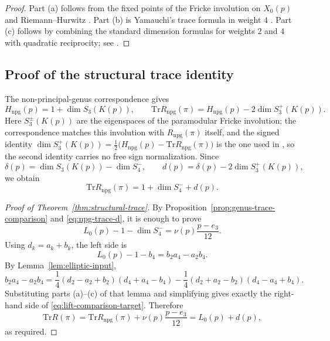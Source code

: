 \documentclass[10pt,a4paper]{amsart}
\newcommand{\Tr}{\mathrm{Tr}}
\begin{document}
	\begin{proof}
		Part \textup{(a)} follows from the fixed points of the Fricke involution
		on $X_0(p)$ and Riemann--Hurwitz \cite[\S2]{Ogg1974}. Part \textup{(b)} is Yamauchi's trace
		formula in weight $4$ \cite{Yamauchi1973}. Part \textup{(c)} follows by combining the standard
		dimension formulas for weights $2$ and $4$ with quadratic reciprocity; see
		\cite{AtkinLehner,Ibukiyama-dim}.
	\end{proof}
	
	\subsection{Proof of the structural trace identity}
	\label{ss:proof-structural-trace}
	
	The non-principal-genus correspondence \cite{DPRT,Ibukiyama-dim} gives
	\begin{equation}\label{eq:npg-dimension-trace}
		H_{\mathrm{npg}}(p)=1+\dim S_3(K(p)),
		\qquad
		\Tr R_{\mathrm{npg}}(\pi)
		=H_{\mathrm{npg}}(p)-2\dim S_3^+(K(p)).
	\end{equation}
	Here $S_3^\pm(K(p))$ are the eigenspaces of the paramodular Fricke
	involution; the correspondence matches this involution with
	$R_{\mathrm{npg}}(\pi)$ itself, and the signed identity
	$\dim S_3^{+}(K(p))=\tfrac12\bigl(H_{\mathrm{npg}}(p)-\Tr R_{\mathrm{npg}}(\pi)\bigr)$
	is the one used in \cite[proof of Prop.~8.2]{Ibukiyama-dim}, so the
	second identity carries no free sign normalization.
	Since
	\[
	\delta(p)=\dim S_3(K(p))-\dim S_4^-,
	\qquad
	d(p)=\delta(p)-2\dim S_3^+(K(p)),
	\]
	we obtain
	\begin{equation}\label{eq:npg-trace-d}
		\Tr R_{\mathrm{npg}}(\pi)=1+\dim S_4^-+d(p).
	\end{equation}
	
	\begin{proof}[Proof of Theorem~\ref{thm:structural-trace}]
		By Proposition~\ref{prop:genus-trace-comparison} and
		\eqref{eq:npg-trace-d}, it is enough to prove
		\begin{equation}\label{eq:lift-comparison-target}
			L_0(p)-1-\dim S_4^-=
			\nu(p)\frac{p-e_3}{12}.
		\end{equation}
		Using $d_k=a_k+b_k$, the left side is
		\[
		L_0(p)-1-b_4=b_2a_4-a_2b_4.
		\]
		By Lemma~\ref{lem:elliptic-input},
		\[
		b_2a_4-a_2b_4
		=\frac14(d_2-a_2+b_2)(d_4+a_4-b_4)
		-\frac14(d_2+a_2-b_2)(d_4-a_4+b_4).
		\]
		Substituting parts \textup{(a)}--\textup{(c)} of that lemma and simplifying
		gives exactly the right-hand side of \eqref{eq:lift-comparison-target}.
		Therefore
		\[
		\Tr R(\pi)
		=\Tr R_{\mathrm{npg}}(\pi)+\nu(p)\frac{p-e_3}{12}
		=L_0(p)+d(p),
		\]
		as required.
	\end{proof}
	
\end{document}

